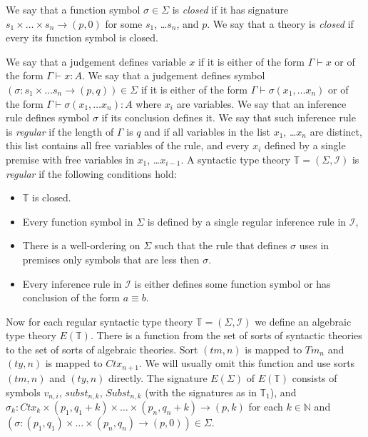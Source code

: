 \documentclass{amsart}
\theoremstyle{definition}
\theoremstyle{remark}
\newcommand{\deq}{\equiv}
\numberwithin{figure}{section}
\begin{document}
We say that a function symbol $\sigma \in \Sigma$ is \emph{closed} if it has signature $s_1 \times \ldots \times s_n \to (p,0)$ for some $s_1$, \ldots $s_n$, and $p$.
We say that a theory is \emph{closed} if every its function symbol is closed.

We say that a judgement defines variable $x$ if it is either of the form $\Gamma \vdash x$ or of the form $\Gamma \vdash x : A$.
We say that a judgement defines symbol $(\sigma : s_1 \times \ldots s_n \to (p,q)) \in \Sigma$ if it is either
of the form $\Gamma \vdash \sigma(x_1, \ldots x_n)$ or of the form $\Gamma \vdash \sigma(x_1, \ldots x_n) : A$ where $x_i$ are variables.
We say that an inference rule defines symbol $\sigma$ if its conclusion defines it.
We say that such inference rule is \emph{regular} if the length of $\Gamma$ is $q$ and
if all variables in the list $x_1$, \ldots $x_n$ are distinct, this list contains all free variables of the rule,
and every $x_i$ defined by a single premise with free variables in $x_1$, \ldots $x_{i-1}$.
A syntactic type theory $\mathbb{T} = (\Sigma, \mathcal{I})$ is \emph{regular} if the following conditions hold:
\begin{itemize}
\item $\mathbb{T}$ is closed.
\item Every function symbol in $\Sigma$ is defined by a single regular inference rule in $\mathcal{I}$,
\item There is a well-ordering on $\Sigma$ such that the rule that defines $\sigma$ uses in premises only symbols that are less then $\sigma$.
\item Every inference rule in $\mathcal{I}$ is either defines some function symbol or has conclusion of the form $a \deq b$.
\end{itemize}

Now for each regular syntactic type theory $\mathbb{T} = (\Sigma, \mathcal{I})$ we define an algebraic type theory $E(\mathbb{T})$.
There is a function from the set of sorts of syntactic theories to the set of sorts of algebraic theories.
Sort $(tm,n)$ is mapped to $Tm_n$ and $(ty,n)$ is mapped to $Ctx_{n+1}$.
We will usually omit this function and use sorts $(tm,n)$ and $(ty,n)$ directly.
The signature $E(\Sigma)$ of $E(\mathbb{T})$ consists of symbols $v_{n,i}$, $subst_{n,k}$, $Subst_{n,k}$ (with the signatures as in $\mathbb{T}_1$), and
$\sigma_k : Ctx_k \times (p_1,q_1+k) \times \ldots \times (p_n,q_n+k) \to (p,k)$
for each $k \in \mathbb{N}$ and $(\sigma : (p_1,q_1) \times \ldots \times (p_n,q_n) \to (p,0)) \in \Sigma$.
\end{document}
